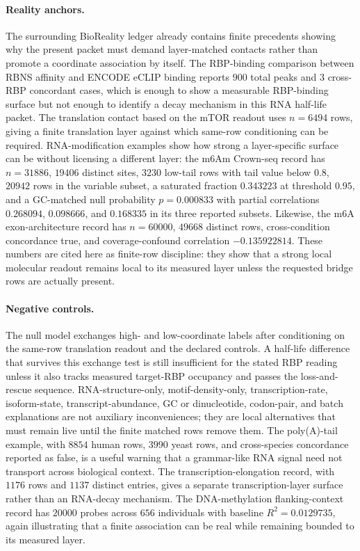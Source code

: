 \paragraph{Reality anchors.}
The surrounding BioReality ledger already contains finite precedents showing why the present packet must demand layer-matched contacts rather than promote a coordinate association by itself.  The RBP-binding comparison between RBNS affinity and ENCODE eCLIP binding reports $900$ total peaks and $3$ cross-RBP concordant cases, which is enough to show a measurable RBP-binding surface but not enough to identify a decay mechanism in this RNA half-life packet.  The translation contact based on the mTOR readout uses $n=6494$ rows, giving a finite translation layer against which same-row conditioning can be required.  RNA-modification examples show how strong a layer-specific surface can be without licensing a different layer: the m6Am Crown-seq record has $n=31886$, $19406$ distinct sites, $3230$ low-tail rows with tail value below $0.8$, $20942$ rows in the variable subset, a saturated fraction $0.343223$ at threshold $0.95$, and a GC-matched null probability $p=0.000833$ with partial correlations $0.268094$, $0.098666$, and $0.168335$ in its three reported subsets.  Likewise, the m6A exon-architecture record has $n=60000$, $49668$ distinct rows, cross-condition concordance true, and coverage-confound correlation $-0.135922814$.  These numbers are cited here as finite-row discipline: they show that a strong local molecular readout remains local to its measured layer unless the requested bridge rows are actually present.

\paragraph{Negative controls.}
The null model exchanges high- and low-coordinate labels after conditioning on the same-row translation readout and the declared controls.  A half-life difference that survives this exchange test is still insufficient for the stated RBP reading unless it also tracks measured target-RBP occupancy and passes the loss-and-rescue sequence.  RNA-structure-only, motif-density-only, transcription-rate, isoform-state, transcript-abundance, GC or dinucleotide, codon-pair, and batch explanations are not auxiliary inconveniences; they are local alternatives that must remain live until the finite matched rows remove them.  The poly(A)-tail example, with $8854$ human rows, $3990$ yeast rows, and cross-species concordance reported as false, is a useful warning that a grammar-like RNA signal need not transport across biological context.  The transcription-elongation record, with $1176$ rows and $1137$ distinct entries, gives a separate transcription-layer surface rather than an RNA-decay mechanism.  The DNA-methylation flanking-context record has $20000$ probes across $656$ individuals with baseline $R^2=0.0129735$, again illustrating that a finite association can be real while remaining bounded to its measured layer.

